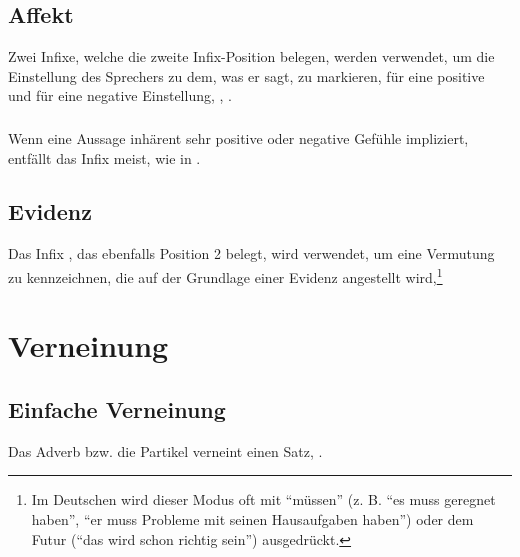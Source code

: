 \subsection{Affekt} Zwei Infixe, welche die zweite Infix-Position belegen, werden verwendet, um die Einstellung des Sprechers zu dem, was er sagt, zu markieren,  für eine positive und  für eine negative Einstellung,  ,  . 

\subsubsection{} Wenn eine Aussage inhärent sehr positive oder negative Gefühle impliziert, entfällt das Infix meist, wie in  .

\subsection{Evidenz} Das Infix , das ebenfalls Position 2 belegt, wird verwendet, um eine Vermutung zu kennzeichnen, die auf der Grundlage einer Evidenz angestellt wird,\footnote{Im Deutschen wird dieser Modus oft mit ``müssen'' (z. B. ``es muss geregnet haben'', ``er muss Probleme mit seinen Hausaufgaben haben'') oder dem Futur (``das wird schon richtig sein'') ausgedrückt.}   


\section{Verneinung}

\subsection{Einfache Verneinung} Das Adverb bzw. die Partikel  verneint einen Satz,  . 


